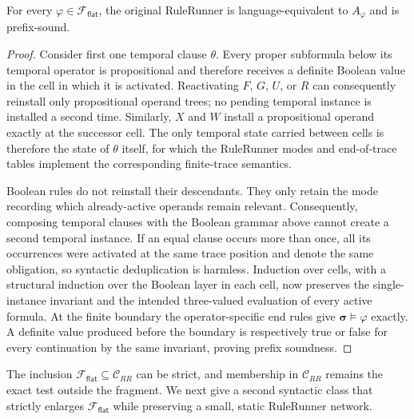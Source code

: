 \begin{theorem}
\label{thm:rulerunner-flat-correct}
For every $\varphi\in\mathcal F_{\mathsf{flat}}$, the original RuleRunner is
language-equivalent to $A_\varphi$ and is prefix-sound.
\end{theorem}

\begin{proof}
Consider first one temporal clause $\theta$.  Every proper subformula below
its temporal operator is propositional and therefore receives a definite
Boolean value in the cell in which it is activated.  Reactivating $F$, $G$,
$U$, or $R$ can consequently reinstall only propositional operand trees; no
pending temporal instance is installed a second time.  Similarly, $X$ and
$W$ install a propositional operand exactly at the successor cell.  The only
temporal state carried between cells is therefore the state of $\theta$
itself, for which the RuleRunner modes and end-of-trace tables implement the
corresponding finite-trace semantics.

Boolean rules do not reinstall their descendants.  They only retain the mode
recording which already-active operands remain relevant.
Consequently, composing temporal clauses with the Boolean grammar above cannot
create a second temporal instance.  If an equal clause occurs more than once,
all its occurrences were activated at the same trace position and denote the
same obligation, so syntactic deduplication is harmless.  Induction over cells,
with a structural induction over the Boolean layer in each cell, now preserves
the single-instance invariant and the intended three-valued evaluation of
every active formula.  At the finite boundary the operator-specific end rules
give $\boldsymbol\sigma\models\varphi$ exactly.  A definite value produced
before the boundary is respectively true or false for every continuation by
the same invariant, proving prefix soundness.
\end{proof}

The inclusion $\mathcal F_{\mathsf{flat}}\subseteq\mathcal C_{RR}$ can be
strict, and membership in $\mathcal C_{RR}$ remains the exact test outside the
fragment.  We next give a second syntactic class that strictly enlarges
$\mathcal F_{\mathsf{flat}}$ while preserving a small, static RuleRunner
network.

